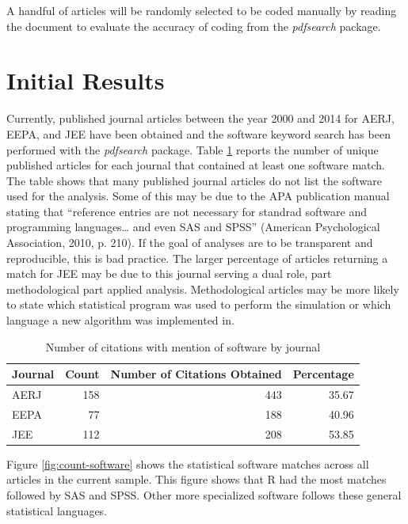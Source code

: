 \documentclass[english,floatsintext,man]{apa6}
\theoremstyle{definition}
\theoremstyle{definition}
\theoremstyle{remark}
\begin{document}
A handful of articles will be randomly selected to be coded manually by
reading the document to evaluate the accuracy of coding from the
\emph{pdfsearch} package.

\section{Initial Results}\label{initial-results}

Currently, published journal articles between the year 2000 and 2014 for
AERJ, EEPA, and JEE have been obtained and the software keyword search
has been performed with the \emph{pdfsearch} package. Table
\ref{tab:setup} reports the number of unique published articles for each
journal that contained at least one software match. The table shows that
many published journal articles do not list the software used for the
analysis. Some of this may be due to the APA publication manual stating
that \enquote{reference entries are not necessary for standrad software
and programming languages\ldots{} and even SAS and SPSS} (American
Psychological Association, 2010, p. 210). If the goal of analyses are to
be transparent and reproducible, this is bad practice. The larger
percentage of articles returning a match for JEE may be due to this
journal serving a dual role, part methodological part applied analysis.
Methodological articles may be more likely to state which statistical
program was used to perform the simulation or which language a new
algorithm was implemented in.

\begin{table}

\caption{\label{tab:setup}Number of citations with mention of software by journal}
\centering
\begin{tabular}[t]{lrrr}
\toprule
Journal & Count & Number of Citations Obtained & Percentage\\
\midrule
AERJ & 158 & 443 & 35.67\\
EEPA & 77 & 188 & 40.96\\
JEE & 112 & 208 & 53.85\\
\bottomrule
\end{tabular}
\end{table}

Figure \ref{fig:count-software} shows the statistical software matches
across all articles in the current sample. This figure shows that R had
the most matches followed by SAS and SPSS. Other more specialized
software follows these general statistical languages.
\end{document}
